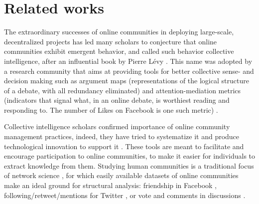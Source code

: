 \documentclass{article}
\begin{document}
\section{Related works}

The extraordinary successes of online communities in deploying large-scale, decentralized projects has led many scholars to conjecture that online communities exhibit emergent behavior, and called such behavior collective intelligence, after an influential book by Pierre L\'evy \cite{pierre1997collective}. This name was adopted by a research community that aims at providing tools for better collective sense- and decision making such as argument maps (representations of the logical structure of a debate, with all redundancy eliminated) \cite{shum2003roots} and attention-mediation metrics (indicators that signal what, in an online debate, is worthiest reading and responding to. The number of Likes on Facebook is one such metric) \cite{klein2012enabling}. 

Collective intelligence scholars confirmed importance of online community management practices, indeed, they have tried to systematize it \cite{diplaris2011emerging} and produce technological innovation to support it \cite{shum2003roots, de2012contested}. 
These tools are meant to facilitate and encourage participation to online communities, to make it easier for individuals to extract knowledge from them.
Studying human communities is a traditional focus of network science \cite{borgatti2009network, burt2009structural}, for which  easily available datasets of online communities make an ideal ground for structural analysis: friendship in Facebook \cite{lewis2008tastes, nick2013toward}, following/retweet/mentions for Twitter \cite{kunegis2013preferential, java2007we, hodas2014simple}, or vote and comments in discussions \cite{hodas2014simple, laniado2011wikipedians, zhang2007expertise, zanetti2012quantitative}. 
\end{document}
